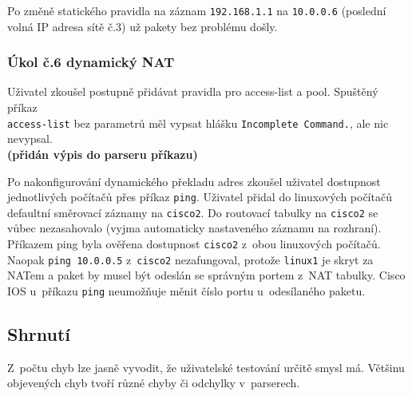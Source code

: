Po změně statického pravidla na záznam \verb|192.168.1.1| na \verb|10.0.0.6| (poslední volná IP adresa sítě č.3) už pakety bez problému došly.

\subsubsection{Úkol č.6 dynamický NAT}
Uživatel zkoušel postupně přidávat pravidla pro access-list a pool. Spuštěný příkaz \\\verb|access-list| bez parametrů měl vypsat hlášku \verb|Incomplete Command.|, ale nic nevypsal.
\\\textbf{(přidán výpis do parseru příkazu)}

Po nakonfigurování dynamického překladu adres zkoušel uživatel dostupnost jednotlivých počítačů přes příkaz \verb|ping|. Uživatel přidal do linuxových počítačů defaultní směrovací záznamy na \verb|cisco2|. Do routovací tabulky na \verb|cisco2| se vůbec nezasahovalo (vyjma automaticky nastaveného záznamu na rozhraní). Příkazem ping byla ověřena dostupnost \verb|cisco2| z~obou linuxových počítačů. Naopak \verb|ping 10.0.0.5| z~\verb|cisco2| nezafungoval, protože \verb|linux1| je skryt za NATem a paket by musel být odeslán se správným portem z~NAT tabulky. Cisco IOS u~příkazu \verb|ping| neumožňuje měnit číslo portu u~odesílaného paketu.



\subsection{Shrnutí}
Z~počtu chyb lze jasně vyvodit, že uživatelské testování určitě smysl má. Většinu objevených chyb tvoří různé chyby či odchylky v~parserech.




